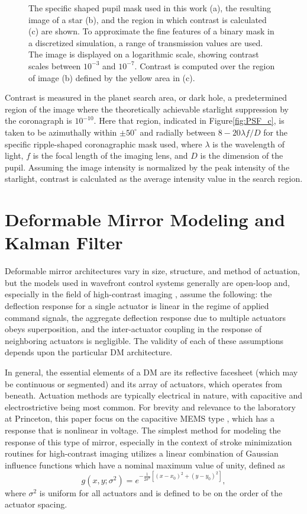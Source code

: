 \documentclass[11pt,reqno]{amsart}
\newcommand{\beq}{\begin{equation}}
\newcommand{\eeq}{\end{equation}}
\begin{document}
\begin{figure}[ht]
\begin{center}
	\end{center}
\caption{The specific shaped pupil mask used in this work (a), the resulting image of a star (b), and the region in which contrast is calculated (c) are shown.  To approximate the fine features of a binary mask in a discretized simulation, a range of transmission values are used.  The image is displayed on a logarithmic scale, showing contrast scales between $10^{-3}$ and $10^{-7}$.  Contrast is computed over the region of image (b) defined by the yellow area in (c).  \label{fig:PSF}}
\end{figure}

Contrast is measured in the planet search area, or dark hole, a predetermined region of the image where the theoretically achievable starlight suppression by the coronagraph is $10^{-10}$.  Here that region, indicated in Figure\:\ref{fig:PSF_c}, is taken to be azimuthally within $\pm50^{\circ}$ and radially between $8-20\lambda f/D$ for the specific ripple-shaped coronagraphic mask used, where $\lambda$ is the wavelength of light, $f$ is the focal length of the imaging lens, and $D$ is the dimension of the pupil.  Assuming the image intensity is normalized by the peak intensity of the starlight, contrast is calculated as the average intensity value in the search region.

\section{Deformable Mirror Modeling and Kalman Filter}\label{sec:DMmodel}
Deformable mirror architectures vary in size, structure, and method of actuation, but the models used in wavefront control systems generally are open-loop \cite{Vogel2006, Morzinski2007, Morzinski2008, Stewart2007} and, especially in the field of high-contrast imaging \cite{Giveon2007, Pueyo2009}, assume the following: the deflection response for a single actuator is linear in the regime of applied command signals, the aggregate deflection response due to multiple actuators obeys superposition, and the inter-actuator coupling in the response of neighboring actuators is negligible.  The validity of each of these assumptions depends upon the particular DM architecture.

In general, the essential elements of a DM are its reflective facesheet (which may be continuous or segmented) and its array of actuators, which operates from beneath.  Actuation methods are typically electrical in nature, with capacitive and electrostrictive being most common.  For brevity and relevance to the laboratory at Princeton, this paper focus on the capacitive MEMS type \cite{Bifano1997, Bifano1999, Bifano2002}, which has a response that is nonlinear in voltage.  The simplest method for modeling the response of this type of mirror, especially in the context of stroke minimization routines for high-contrast imaging utilizes a linear combination of Gaussian influence functions which have a nominal maximum value of unity, defined as
\beq g(x,y;\sigma^2) = e^{-\frac{1}{2\sigma^2}\left[(x-x_0)^2 + (y-y_0)^2\right]}, \eeq
where $\sigma^2$ is uniform for all actuators and is defined to be on the order of the actuator spacing.
\end{document}
